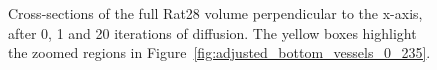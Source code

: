 \begin{figure}[htbp]
      \caption{Cross-sections of the full Rat28 volume perpendicular to the x-axis, after 0, 1 and 20 iterations of diffusion. The yellow boxes highlight the zoomed regions in Figure~\ref{fig:adjusted_bottom_vessels_0_235}.}
      \label{fig:adjusted_0_235}
    \end{figure}

    \begin{figure}[htbp]
      \centering

\end{figure}
